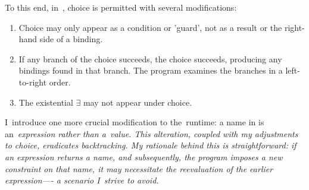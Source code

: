 \documentclass[manuscript,screen 12pt, nonacm]{acmart}
\begin{document}
    To this end, in~\VMinus, choice is permitted with several modifications:
    
        \begin{enumerate}
        \item Choice may only appear as a condition or 'guard', not as a result
        or the right-hand side of a binding.
        \item If any branch of the choice succeeds, the choice succeeds,
        producing any bindings found in that branch. The program examines the
        branches in a left-to-right order.
        \item The existential $\exists$ may not appear under choice.
        \end{enumerate}
        
        I~introduce one more crucial modification to the~\VC runtime: a name in
        \VMinus is an~\it{expression} rather than a~\it{value}. This alteration,
        coupled with my adjustments to choice, eradicates backtracking. My
        rationale behind this is straightforward: if an expression returns a
        name, and subsequently, the program imposes a new constraint on that
        name, it may necessitate the reevaluation of the earlier expression—- a
        scenario I~strive to avoid. 




\end{document}
